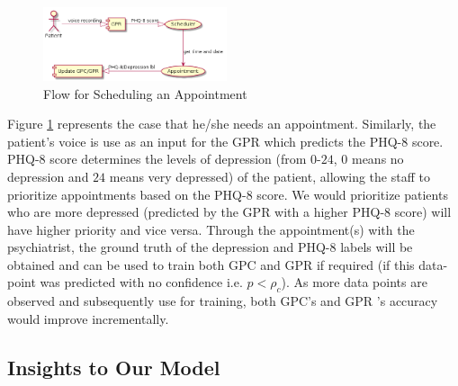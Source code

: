 \documentclass{article}
\begin{document}
	\begin{figure}[h]
 		\begin{center}
		\includegraphics[width=0.48\textwidth]{appointment} 
  		\end{center}
  		\caption{Flow for Scheduling an Appointment}
  		\label{sch_app} 
 	\end{figure}

	Figure \ref{sch_app} represents the case that he/she needs an appointment. 
    Similarly, the patient's voice is use as an input for the GPR which predicts the PHQ-8 score. 
    PHQ-8 score determines the levels of depression (from $0$-$24$, $0$ means no depression and $24$ means very depressed) of the patient, allowing the staff to prioritize appointments based on the PHQ-8 score.
    We would prioritize patients who are more depressed (predicted by the GPR with a higher PHQ-8 score) will have higher priority and vice versa.
    Through the appointment(s) with the psychiatrist, the ground truth of the depression and PHQ-8 labels will be obtained and can be used to train both GPC and GPR if required (if this data-point was predicted with no confidence i.e. $p < \rho_c$).
    As more data points are observed and subsequently use for training, both GPC's and GPR 's accuracy would improve incrementally.

	\subsection{Insights to Our Model}
\end{document}
